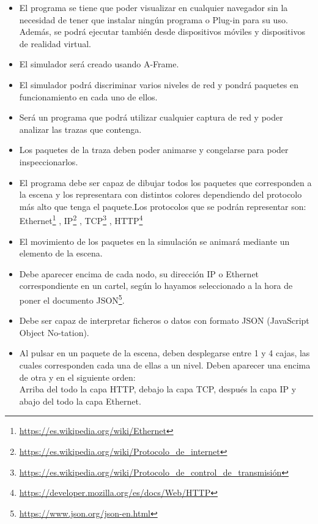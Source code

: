 \documentclass[a4paper, 12pt]{book}
\begin{document}
\begin{itemize}
\item El programa se tiene que poder visualizar en cualquier navegador sin la necesidad de tener que instalar ningún programa o Plug-in para su uso. Además, se podrá ejecutar también desde dispositivos móviles y dispositivos de realidad virtual.

\item El simulador será creado usando A-Frame.

\item El simulador podrá discriminar varios niveles de red y pondrá paquetes en funcionamiento en cada uno de ellos.

\item Será un programa que podrá utilizar cualquier captura de red y poder analizar las trazas que contenga.

\item Los paquetes de la traza deben poder animarse y congelarse para poder inspeccionarlos.

\item El programa debe ser capaz de dibujar todos los paquetes que corresponden a la escena y los representara con distintos colores dependiendo del protocolo más alto que tenga el paquete.Los protocolos que se podrán representar son: Ethernet\footnote{\url{https://es.wikipedia.org/wiki/Ethernet}}
, IP\footnote{\url{https://es.wikipedia.org/wiki/Protocolo_de_internet}}
, TCP\footnote{\url{https://es.wikipedia.org/wiki/Protocolo_de_control_de_transmisión}}
, HTTP\footnote{\url{https://developer.mozilla.org/es/docs/Web/HTTP}}

\item El movimiento de los paquetes en la simulación se animará mediante un elemento de la escena.

\item Debe aparecer encima de cada nodo, su dirección IP o Ethernet correspondiente en un cartel, según lo hayamos seleccionado a la hora de poner el documento JSON\footnote{\url{https://www.json.org/json-en.html}}.

\item Debe ser capaz de interpretar ficheros o datos con formato JSON (JavaScript Object No-tation).

\item Al pulsar en un paquete de la escena, deben desplegarse entre 1 y 4 cajas, las cuales corresponden cada una de ellas a un nivel. Deben aparecer una encima de otra y en el siguiente orden:\\
Arriba del todo la capa HTTP, debajo la capa TCP, después la capa IP y abajo del todo la capa Ethernet.


\end{itemize}
\end{document}
